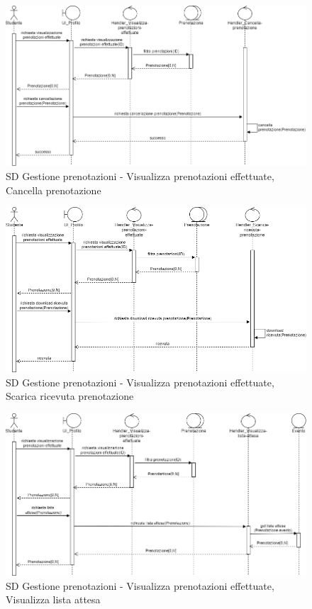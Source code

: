 \documentclass[11pt]{article}
\begin{document}
\begin{figure}[H]
\centering
\includegraphics[width=1\textwidth]{SD Gestione prenotazioni - Cancella prenotazione.png}
\caption{SD Gestione prenotazioni - Visualizza prenotazioni effettuate, Cancella prenotazione}
\end{figure}

\begin{figure}[H]
\centering
\includegraphics[width=1\textwidth]{SD Gestione prenotazioni - Scarica ricevuta prenotazione.png}
\caption{SD Gestione prenotazioni - Visualizza prenotazioni effettuate, Scarica ricevuta prenotazione}
\end{figure}

\begin{figure}[H]
\centering
\includegraphics[width=1\textwidth]{SD Gestione prenotazioni - Visualizza lista attesa.png}
\caption{SD Gestione prenotazioni - Visualizza prenotazioni effettuate, Visualizza lista attesa}
\end{figure}
\end{document}
